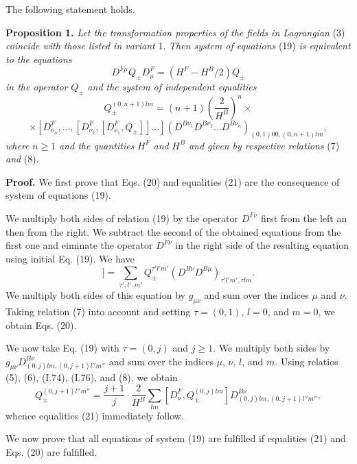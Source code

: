 \documentclass[a4paper,12pt]{article}
\begin{document}
The following statement holds.  

{\bf Proposition 1.} {\it Let the transformation properties of the fields in
Lagrangian} (3) {\it coincide with those listed in variant} 1. {\it Then system 
of equations} (19) {\it is equivalent to the equations} 
\begin{equation}
D^{F \mu} Q_{\pm} D^{F}_{\mu}
= (H^{F} -H^{B}/2) Q_{\pm}
\end{equation}
{\it in the operator} $Q_{\pm}$ {\it and the system of independent equalities}
$$Q^{(0,n+1)lm}_{\pm} = (n+1) \left( \frac{2}{H^{B}} \right)^{n} \times$$
\begin{equation}
\times [D^{F}_{\nu_{n}}, \ldots, [D^{F}_{\nu_{2}},[D^{F}_{\nu_{1}},Q_{\pm}]] 
\ldots ] \left( D^{B\nu_{1}}D^{B\nu_{2}}\ldots D^{B\nu_{n}} 
\right)_{(0,1)00,(0,n+1)lm},
\end{equation}
{\it where} $n \geq 1$ {\it and the quantities} $H^{F}$ {\it and} $H^{B}$ 
{\it and given by respective relations} (7) {\it and} (8). 

{\bf Proof.} We first prove that Eqs. (20) and equalities (21) are the
consequence of system of equations (19). 

We multiply both sides of relation (19) by the operator $D^{F \nu}$ first from
the left an then from the right. We subtract the second of the obtained
equations from the first one and eiminate the operator $D^{F \nu}$ in the right
side of the resulting equation using initial Eq. (19). We have
\begin{equation}
[D^{F \nu},[D^{F \mu},Q^{\tau lm}_{\pm}]] =
\sum_{\tau',l',m'} Q^{\tau' l'm'}_{\pm} 
\left( D^{B \nu}D^{B \mu} \right)_{\tau' l'm', \tau lm}.
\end{equation}
We multiply both sides of this equation by $g_{\mu\nu}$ and sum over the
indices $\mu$ and $\nu$. Taking relation (7) into account and setting
$\tau = (0,1)$, $l=0$, and $m=0$, we obtain Eqs. (20).

We now take Eq. (19) with $\tau = (0,j)$ and $j \geq 1$. We multiply both sides
by $g_{\mu\nu}D^{B \nu}_{(0,j)lm, (0,j+1)l''m''}$ and sum over the indices 
$\mu$, $\nu$, $l$, and $m$. Using relatios (5), (6), (I.74), (I.76), and (8),
we obtain
$$Q^{(0,j+1)l''m''}_{\pm} =\frac{j+1}{j}\cdot\frac{2}{H^{B}}
\sum_{lm} [D^{F}_{\nu},Q^{(0,j)lm}_{\pm}] D^{B \nu}_{(0,j)lm, (0,j+1)l''m''},$$
whence equalities (21) immediately follow.

We now prove that all equations of system (19) are fulfilled if equalities
(21) and Eqs. (20) are fulfilled. 
\end{document}
